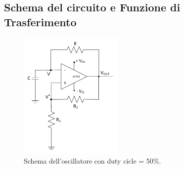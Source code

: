 \documentclass{report}
\begin{document}
\subsection{Schema del circuito e Funzione di Trasferimento}
\begin{figure}[h]
	\centering
	\includegraphics[height=6.2cm]{immagini/schema3}
	\caption{Schema dell'oscillatore con duty cicle = 50\%.}
	\label{figura:schema3}
\end{figure}
\end{document}
